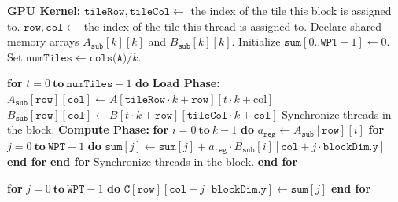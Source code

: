 \documentclass{article}
\begin{document}
\begin{algorithm}[H]
\caption{Tiled Matrix Multiplication with Thread Coarsening on a GPU}
\label{alg:thread_coarsened_tiled_matrix_multiplication}
\begin{algorithmic}
    \State \textbf{GPU Kernel:}
    \State \quad \(\texttt{tileRow}, \texttt{tileCol} \gets\) the index of the tile this block is assigned to.
    \State \quad \(\texttt{row}, \texttt{col} \gets\) the index of the tile this thread is assigned to.
    \State \quad Declare shared memory arrays \(A_{\texttt{sub}}[k][k]\) and \(B_{\texttt{sub}}[k][k]\).
    \State \quad Initialize \(\texttt{sum}[0..\texttt{WPT}-1] \gets 0\).
    \State \quad Set \(\texttt{numTiles} \gets \texttt{cols(A)} / k\). 

    \vspace{0.5\baselineskip}
    \State \quad \textbf{for } \(t = 0 \ \textbf{to}\ \texttt{numTiles} - 1\) \textbf{ do}
    \State \quad \quad \textbf{Load Phase:}
    \State \quad \quad \quad $A_{\texttt{sub}}[\texttt{row}][\texttt{col}] \gets A[\texttt{tileRow} \cdot k + \texttt{row}][t \cdot k + \text{col}]$
    \State \quad \quad \quad $B_{\texttt{sub}}[\texttt{row}][\texttt{col}] \gets B[t \cdot k + \texttt{row}][\texttt{tileCol} \cdot k + \texttt{col}]$
    \State \quad \quad \quad Synchronize threads in the block.
    \State \quad \quad \textbf{Compute Phase:}
    \State \quad \quad \quad \textbf{for } \(i = 0 \ \textbf{to}\ k - 1\) \textbf{ do}
    \State \quad \quad \quad \quad $a_{\texttt{reg}} \gets A_{\texttt{sub}}[\texttt{row}][i]$ 
    \State \quad \quad \quad \quad \textbf{for } \(j = 0 \ \textbf{to}\ \texttt{WPT} - 1\) \textbf{ do}
    \State \quad \quad \quad \quad \quad \(\texttt{sum}[j] \gets \texttt{sum}[j] + a_{\texttt{reg}} \cdot B_{\texttt{sub}}[i][\texttt {col} + j \cdot \texttt{blockDim.y}]\) 
    \State \quad \quad \quad \quad \textbf{end for}
    \State \quad \quad \quad \textbf{end for}
    \State \quad \quad \quad Synchronize threads in the block.
    \State \quad \textbf{end for}

    \vspace{0.5\baselineskip}
    \State \quad \textbf{for } \(j = 0 \ \textbf{to}\ \texttt{WPT} - 1\) \textbf{ do}
    \State \quad \quad \(\texttt{C}[\texttt{row}][\texttt{col} + j \cdot \texttt{blockDim.y}] \gets \texttt{sum}[j]\)
    \State \quad \textbf{end for}
\end{algorithmic}
\end{algorithm}
\end{document}
